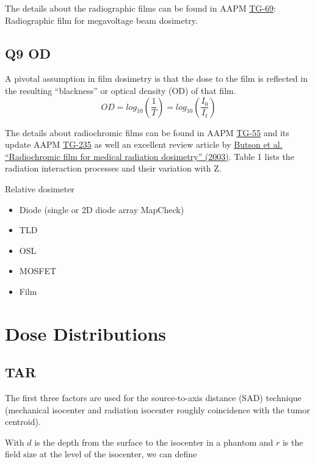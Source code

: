 \documentclass[]{book}
\providecommand{\tightlist}{%
  \setlength{\itemsep}{0pt}\setlength{\parskip}{0pt}}
\theoremstyle{definition}
\theoremstyle{definition}
\theoremstyle{definition}
\theoremstyle{remark}
\begin{document}
The details about the radiographic films can be found in AAPM
\href{https://www.aapm.org/pubs/reports/RPT_216.pdf}{TG-69}:
Radiographic film for megavoltage beam dosimetry.

\section{Q9 OD}\label{q9-od}

A pivotal assumption in film dosimetry is that the dose to the film is
reflected in the resulting ``blackness'' or optical density (OD) of that
film.\\
\[OD=log_{10}\left( \frac{1}{T}\right)=log_{10}\left( \frac{I_0}{I_t}\right)\]

The details about radiochromic films can be found in AAPM
\href{http://www.aapm.org/pubs/reports/RPT_216.pdf}{TG-55} and its
update AAPM
\href{http://www.aapm.org/org/structure/default.asp?committee_code=TG235}{TG-235}
as well an excellent review article by
\href{http://hepweb03.phys.sinica.edu.tw/opto/Irradiation/RadioChromic/Documents/MSE41_61.pdf}{Butson
et al. ``Radiochromic film for medical radiation dosimetry'' (2003)}.
Table 1 lists the radiation interaction processes and their variation
with Z.

Relative dosimeter

\begin{itemize}
\tightlist
\item
  Diode (single or 2D diode array MapCheck)
\item
  TLD
\item
  OSL
\item
  MOSFET
\item
  Film
\end{itemize}

\chapter{Dose Distributions}\label{distribution}

\section{TAR}\label{tar}

The first three factors are used for the source-to-axis distance (SAD)
technique (mechanical isocenter and radiation isocenter roughly
coincidence with the tumor centroid).

With \(d\) is the depth from the surface to the isocenter in a phantom
and \(r\) is the field size at the level of the isocenter, we can define
\end{document}
